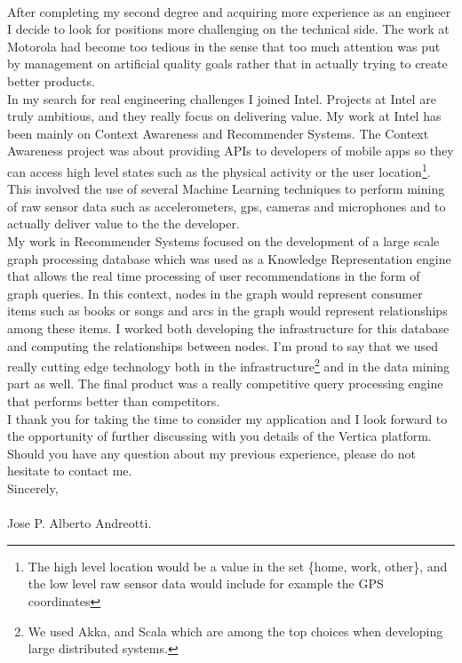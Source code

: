 \documentclass[letter,12pt,english]{article}
\begin{document}
\\
After completing my second degree and acquiring more experience as an engineer I decide to look
for positions more challenging on the technical side. The work at Motorola had become too tedious
in the sense that too much attention was put by management on artificial quality goals rather
that in actually trying to create better products.
\\
In my search for real engineering challenges I joined Intel. Projects at Intel are truly ambitious,
and they really focus on delivering value. My work at Intel has been mainly on Context Awareness and 
Recommender Systems. The Context Awareness project was about providing APIs to developers of mobile apps
so they can access high level states such as the physical activity or the user 
location\footnote{The high level location would be a value in the set \{home, work, other\}, and the low
level raw sensor data would include for example the GPS coordinates}.
This involved the use of several Machine Learning techniques to perform mining of raw sensor data such
as accelerometers, gps, cameras and microphones and to actually deliver value to the the developer.\\
My work in Recommender Systems focused on the development of a large scale graph processing database which 
was used as a Knowledge Representation engine that allows the real time processing of user recommendations in 
the form of graph queries. In this context, nodes in the graph would represent consumer items such as books or 
songs and arcs in the graph would represent relationships among these items. I worked both developing the 
infrastructure for this database and computing the relationships between nodes. I'm proud to say
that we used really cutting edge technology both in the infrastructure\footnote{We used Akka, and Scala
which are among the top choices when developing large distributed systems.} and in the data mining part as well.
The final product was a really competitive query processing engine that performs better than competitors.
\\
I thank you for taking the time to consider my application and I look forward to the opportunity of further
discussing with you details of the Vertica platform. Should you have any question about my previous experience,
please do not hesitate to contact me.
\\

Sincerely,
\\
\\
Jose P. Alberto Andreotti.
\end{document}
